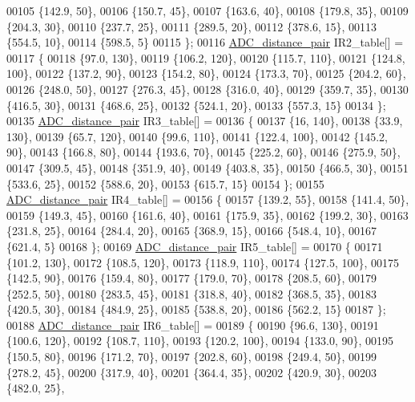 \begin{DoxyCode}
00105     \{142.9, 50\},
00106     \{150.7, 45\},
00107     \{163.6, 40\},
00108     \{179.8, 35\},
00109     \{204.3, 30\},
00110     \{237.7, 25\},
00111     \{289.5, 20\},
00112     \{378.6, 15\},
00113     \{554.5, 10\},
00114     \{598.5, 5\}
00115 \};
00116 \hyperlink{struct_a_d_c__distance__pair}{ADC\_distance\_pair} IR2\_table[] =
00117 \{
00118     \{97.0, 130\},
00119     \{106.2, 120\},
00120     \{115.7, 110\},
00121     \{124.8, 100\},
00122     \{137.2, 90\},
00123     \{154.2, 80\},
00124     \{173.3, 70\},
00125     \{204.2, 60\},
00126     \{248.0, 50\},
00127     \{276.3, 45\},
00128     \{316.0, 40\},
00129     \{359.7, 35\},
00130     \{416.5, 30\},
00131     \{468.6, 25\},
00132     \{524.1, 20\},
00133     \{557.3, 15\}
00134 \};
00135 \hyperlink{struct_a_d_c__distance__pair}{ADC\_distance\_pair} IR3\_table[] =
00136 \{
00137     \{16, 140\},
00138     \{33.9, 130\},
00139     \{65.7, 120\},
00140     \{99.6, 110\},
00141     \{122.4, 100\},
00142     \{145.2, 90\},
00143     \{166.8, 80\},
00144     \{193.6, 70\},
00145     \{225.2, 60\},
00146     \{275.9, 50\},
00147     \{309.5, 45\},
00148     \{351.9, 40\},
00149     \{403.8, 35\},
00150     \{466.5, 30\},
00151     \{533.6, 25\},
00152     \{588.6, 20\},
00153     \{615.7, 15\}
00154 \};
00155 \hyperlink{struct_a_d_c__distance__pair}{ADC\_distance\_pair} IR4\_table[] =
00156 \{
00157     \{139.2, 55\},
00158     \{141.4, 50\},
00159     \{149.3, 45\},
00160     \{161.6, 40\},
00161     \{175.9, 35\},
00162     \{199.2, 30\},
00163     \{231.8, 25\},
00164     \{284.4, 20\},
00165     \{368.9, 15\},
00166     \{548.4, 10\},
00167     \{621.4, 5\}
00168 \};
00169 \hyperlink{struct_a_d_c__distance__pair}{ADC\_distance\_pair} IR5\_table[] =
00170 \{
00171     \{101.2, 130\},
00172     \{108.5, 120\},
00173     \{118.9, 110\},
00174     \{127.5, 100\},
00175     \{142.5, 90\},
00176     \{159.4, 80\},
00177     \{179.0, 70\},
00178     \{208.5, 60\},
00179     \{252.5, 50\},
00180     \{283.5, 45\},
00181     \{318.8, 40\},
00182     \{368.5, 35\},
00183     \{420.5, 30\},
00184     \{484.9, 25\},
00185     \{538.8, 20\},
00186     \{562.2, 15\}
00187 \};
00188 \hyperlink{struct_a_d_c__distance__pair}{ADC\_distance\_pair} IR6\_table[] =
00189 \{
00190     \{96.6, 130\},
00191     \{100.6, 120\},
00192     \{108.7, 110\},
00193     \{120.2, 100\},
00194     \{133.0, 90\},
00195     \{150.5, 80\},
00196     \{171.2, 70\},
00197     \{202.8, 60\},
00198     \{249.4, 50\},
00199     \{278.2, 45\},
00200     \{317.9, 40\},
00201     \{364.4, 35\},
00202     \{420.9, 30\},
00203     \{482.0, 25\},

\end{DoxyCode}
